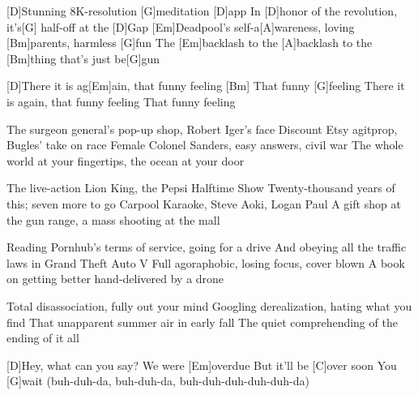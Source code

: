 

\begin{guitar}
	[D]Stunning 8K-resolution [G]meditation [D]app
	In [D]honor of the revolution, it's[G] half-off at the [D]Gap
	[Em]Deadpool's self-a[A]wareness, loving [Bm]parents, harmless [G]fun
	The [Em]backlash to the [A]backlash to the [Bm]thing that's just be[G]gun
	
	[D]There it is ag[Em]ain, that funny feeling
	[Bm] That funny [G]feeling
	There it is again, that funny feeling
	That funny feeling
	
	The surgeon general's pop-up shop, Robert Iger's face
	Discount Etsy agitprop, Bugles' take on race
	Female Colonel Sanders, easy answers, civil war
	The whole world at your fingertips, the ocean at your door
	
	The live-action Lion King, the Pepsi Halftime Show
	Twenty-thousand years of this; seven more to go
	Carpool Karaoke, Steve Aoki, Logan Paul
	A gift shop at the gun range, a mass shooting at the mall
	
	 
	
	Reading Pornhub's terms of service, going for a drive
	And obeying all the traffic laws in Grand Theft Auto V
	Full agoraphobic, losing focus, cover blown
	A book on getting better hand-delivered by a drone
	
	Total disassociation, fully out your mind
	Googling derealization, hating what you find
	That unapparent summer air in early fall
	The quiet comprehending of the ending of it all
	
	 
	\pagebreak
	[D]Hey, what can you say?
	We were [Em]overdue
	But it'll be [C]over soon
	You [G]wait (buh-duh-da, buh-duh-da, buh-duh-duh-duh-duh-da)
\end{guitar}